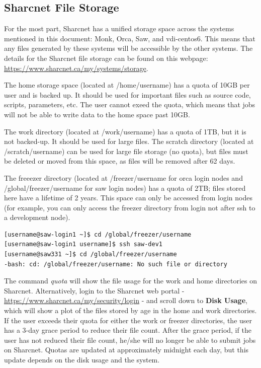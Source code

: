 \documentclass[12pt]{article}
\begin{document}
\subsection{Sharcnet File Storage}
\quad For the most part, Sharcnet has a unified storage space across the systems mentioned in this document: Monk, Orca, Saw, and vdi-centos6. This means that any files generated by these systems will be accessible by the other systems. The details for the Sharcnet file storage can be found on this webpage: \url{https://www.sharcnet.ca/my/systems/storage}. 

\quad The home storage space (located at /home/username) has a quota of 10GB per user and is backed up. It should be used for important files such as source code, scripts, parameters, etc. The user cannot exeed the quota, which means that jobs will not be able to write data to the home space past 10GB. 

\quad The work directory (located at /work/username) has a quota of 1TB, but it is not backed-up. It should be used for large files. The scratch directory (located at /scratch/username) can be used for large file storage (no quota), but files must be deleted or moved from this space, as files will be removed after 62 days. 

\quad The freeezer directory (located at /freezer/username for orca login nodes and /global/freezer/username for saw login nodes) has a quota of 2TB; files stored here have a lifetime of 2 years. This space can only be accessed from login nodes (for example, you can only access the freezer directory from login not after ssh to a development node).

\begin{lstlisting}[numbers=none]
[username@saw-login1 ~]$ cd /global/freezer/username
[username@saw-login1 username]$ ssh saw-dev1
[username@saw331 ~]$ cd /global/freezer/username
-bash: cd: /global/freezer/username: No such file or directory
\end{lstlisting}
\quad The command \textit{quota} will show the file usage for the work and home directories on Sharcnet. Alternatively, login to the Sharcnet web portal - \url{https://www.sharcnet.ca/my/security/login} - and scroll down to \textbf{Disk Usage}, which will show a plot of the files stored by age in the home and work directories. If the user exceeds their quota for either the work or freezer directories, the user has a 3-day grace period to reduce their file count. After the grace period, if the user has not reduced their file count, he/she will no longer be able to submit jobs on Sharcnet. Quotas are updated at approximately midnight each day, but this update depends on the disk usage and the system.
\end{document}
